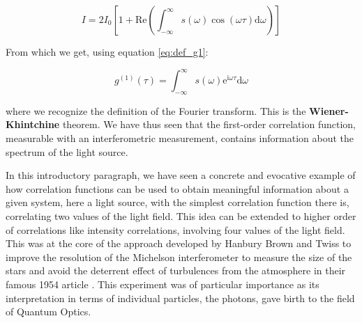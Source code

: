 \begin{equation}
    I=2 I_{0}\left[1+\mathrm{Re} \left(\int_{-\infty}^{\infty} s(\omega) \cos (\omega \tau) \mathrm{d} \omega\right)\right]
\end{equation}

\noindent From which we get, using equation \ref{eq:def_g1}:

\begin{equation}
    g^{(1)}(\tau)=\int_{-\infty}^{\infty} s(\omega) \mathrm{e}^{\mathrm{i} \omega \tau} \mathrm{d} \omega
\end{equation}

\noindent where we recognize the definition of the Fourier transform. This is the \textbf{Wiener-Khintchine} theorem. We have thus seen that the first-order correlation function, measurable with an interferometric measurement, contains information about the spectrum of the light source. 




In this introductory paragraph, we have seen a concrete and evocative example of how correlation functions can be used to obtain meaningful information about a given system, here a light source, with the simplest correlation function there is, correlating two values of the light field. This idea can be extended to higher order of correlations like intensity correlations, involving four values of the light field. This was at the core of the approach developed by Hanbury Brown and Twiss to improve the resolution of the Michelson interferometer to measure the size of the stars and avoid the deterrent effect of turbulences from the atmosphere in their famous 1954 article \cite{brown1954lxxiv}. This experiment was of particular importance as its interpretation in terms of individual particles, the photons, gave birth to the field of Quantum Optics. 






